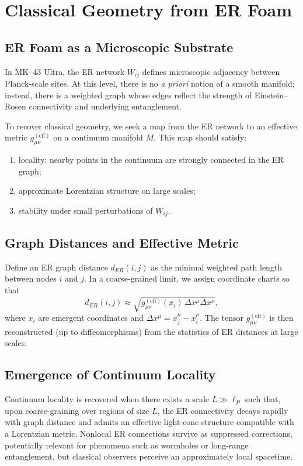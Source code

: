 \chapter{Classical Geometry from ER Foam}

\section{ER Foam as a Microscopic Substrate}

In MK--43 Ultra, the ER network $W_{ij}$ defines microscopic adjacency between Planck-scale sites.
At this level, there is no \emph{a priori} notion of a smooth manifold; instead, there is a weighted graph whose edges reflect the strength of Einstein--Rosen connectivity and underlying entanglement.

To recover classical geometry, we seek a map from the ER network to an effective metric $g_{\mu\nu}^{\mathrm{(eff)}}$ on a continuum manifold $M$.
This map should satisfy:
\begin{enumerate}
  \item locality: nearby points in the continuum are strongly connected in the ER graph;
  \item approximate Lorentzian structure on large scales;
  \item stability under small perturbations of $W_{ij}$.
\end{enumerate}

\section{Graph Distances and Effective Metric}

Define an ER graph distance $d_{ER}(i,j)$ as the minimal weighted path length between nodes $i$ and $j$.
In a coarse-grained limit, we assign coordinate charts so that
\[
  d_{ER}(i,j) \approx \sqrt{g_{\mu\nu}^{\mathrm{(eff)}}(x_i)\,\Delta x^\mu\Delta x^\nu},
\]
where $x_i$ are emergent coordinates and $\Delta x^\mu = x_j^\mu - x_i^\mu$.
The tensor $g_{\mu\nu}^{\mathrm{(eff)}}$ is then reconstructed (up to diffeomorphisms) from the statistics of ER distances at large scales.

\section{Emergence of Continuum Locality}

Continuum locality is recovered when there exists a scale $L\gg \ell_P$ such that, upon coarse-graining over regions of size $L$, the ER connectivity decays rapidly with graph distance and admits an effective light-cone structure compatible with a Lorentzian metric.
Nonlocal ER connections survive as suppressed corrections, potentially relevant for phenomena such as wormholes or long-range entanglement, but classical observers perceive an approximately local spacetime.


